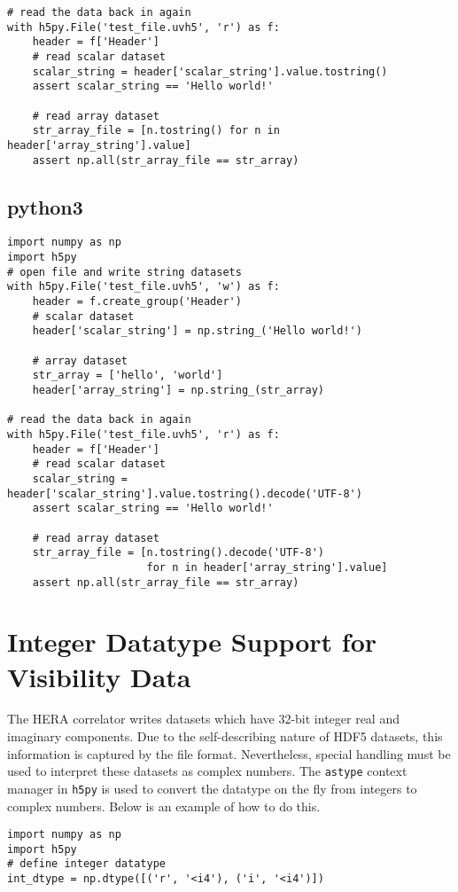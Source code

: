 \documentclass[11pt, oneside]{article}
\begin{document}
\begin{appendices}
\begin{verbatim}
# read the data back in again
with h5py.File('test_file.uvh5', 'r') as f:
    header = f['Header']
    # read scalar dataset
    scalar_string = header['scalar_string'].value.tostring()
    assert scalar_string == 'Hello world!'

    # read array dataset
    str_array_file = [n.tostring() for n in header['array_string'].value]
    assert np.all(str_array_file == str_array)
\end{verbatim}

\subsection{python3}
\begin{verbatim}
import numpy as np
import h5py
# open file and write string datasets
with h5py.File('test_file.uvh5', 'w') as f:
    header = f.create_group('Header')
    # scalar dataset
    header['scalar_string'] = np.string_('Hello world!')

    # array dataset
    str_array = ['hello', 'world']
    header['array_string'] = np.string_(str_array)

# read the data back in again
with h5py.File('test_file.uvh5', 'r') as f:
    header = f['Header']
    # read scalar dataset
    scalar_string = header['scalar_string'].value.tostring().decode('UTF-8')
    assert scalar_string == 'Hello world!'

    # read array dataset
    str_array_file = [n.tostring().decode('UTF-8')
                      for n in header['array_string'].value]
    assert np.all(str_array_file == str_array)
\end{verbatim}


\section{Integer Datatype Support for Visibility Data}
\label{appendix:integers}
The HERA correlator writes datasets which have 32-bit integer real and imaginary
components. Due to the self-describing nature of HDF5 datasets, this information
is captured by the file format. Nevertheless, special handling must be used to
interpret these datasets as complex numbers. The \verb+astype+ context manager
in \verb+h5py+ is used to convert the datatype on the fly from integers to
complex numbers. Below is an example of how to do this.

\begin{verbatim}
import numpy as np
import h5py
# define integer datatype
int_dtype = np.dtype([('r', '<i4'), ('i', '<i4')])


\end{verbatim}
\end{appendices}
\end{document}
